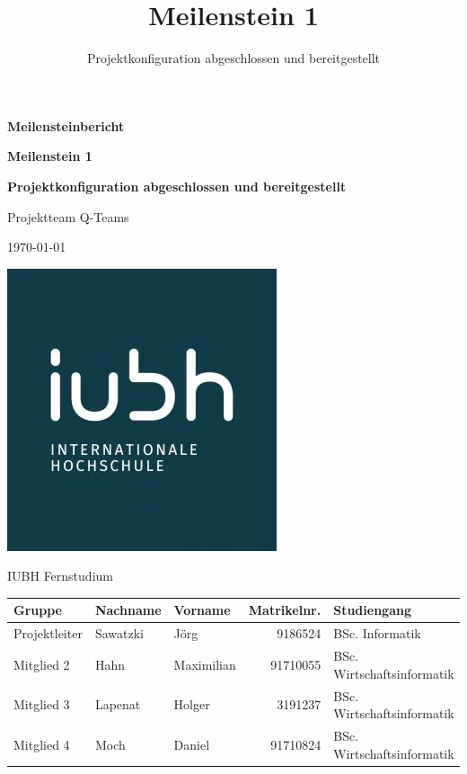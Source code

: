 \documentclass[a4paper,11pt,listof=numbered,glossary=totoc,parskip=half,toc=bib]{scrreprt}
\title{Meilenstein 1}
\subtitle{Projektkonfiguration abgeschlossen und bereitgestellt}
\begin{document}
	\begin{titlepage}
		
		\centering
		\vspace*{2.5cm}
		{\large\bfseries Meilensteinbericht\par}	
		{\Huge\bfseries Meilenstein 1\par}
		{\Large\bfseries Projektkonfiguration abgeschlossen und bereitgestellt\par}

		{\Large Projektteam \frqq{}Q-Teams\flqq{}\par}
		{\large\today\par}
		\vspace{0.5cm}

			
		
		\includegraphics[scale=0.5]{iubh_logo}
		
		IUBH Fernstudium
		\vspace{0.5cm}
		
		\begin{tabular}{lllrl}
			\toprule
			\textbf{Gruppe} & \textbf{Nachname} & \textbf{Vorname} & \textbf{Matrikelnr.} & \textbf{Studiengang} \\
			\midrule
			Projektleiter & Sawatzki & Jörg & 9186524 & BSc. Informatik \\
			Mitglied 2 & Hahn & Maximilian & 91710055 & BSc. Wirtschaftsinformatik \\
			Mitglied 3 & Lapenat & Holger & 3191237 & BSc. Wirtschaftsinformatik \\
			Mitglied 4 & Moch & Daniel & 91710824 & BSc. Wirtschaftsinformatik \\
			\bottomrule
		\end{tabular}	
	\end{titlepage}
	
\end{document}
